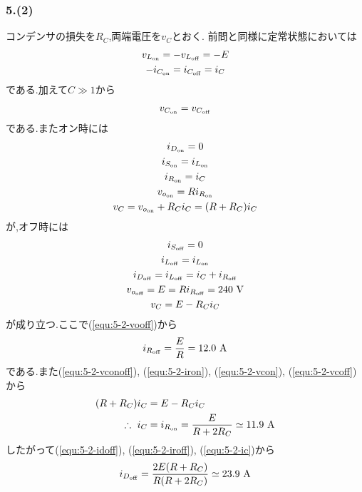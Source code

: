 \subsubsection*{5.(2)}
コンデンサの損失を$R_C$,両端電圧を$v_C$とおく.
前問と同様に定常状態においては
\begin{gather}
  v_{L_{\rm on}}=-v_{L_{\rm off}}=-E\\
  -i_{C_{\rm on}}=i_{C_{\rm off}}=i_C
\end{gather}
である.加えて$C\gg1$から
\begin{align}
  \label{equ:5-2-vconoff}
  v_{C_{\rm on}}=v_{C_{\rm off}}
\end{align}
である.またオン時には
\begin{gather}
  i_{D_{\rm on}}=0\\
  \label{equ:5-2-ison}
  i_{S_{\rm on}}=i_{L_{\rm on}}\\
  \label{equ:5-2-iron}
  i_{R_{\rm on}}=i_C\\
  \label{equ:5-2-voon}
  v_{o_{\rm on}}=Ri_{R_{\rm on}}\\
  \label{equ:5-2-vcon}
  v_C=v_{o_{\rm on}}+R_Ci_C=(R+R_C)i_C
\end{gather}
が,オフ時には
\begin{gather}
  i_{S_{\rm off}}=0\\
  \label{equ:5-2-iloff}
  i_{L_{\rm off}}=i_{L_{\rm on}}\\
  \label{equ:5-2-idoff}
  i_{D_{\rm off}}=i_{L_{\rm off}}=i_C+i_{R_{\rm off}}\\
  \label{equ:5-2-vooff}
  v_{o_{\rm off}}=E=Ri_{R_{\rm off}}=240\ \si{\volt}\\
  \label{equ:5-2-vcoff}
  v_C=E-R_Ci_C
\end{gather}
が成り立つ.ここで(\ref{equ:5-2-vooff})から
\begin{align}
  \label{equ:5-2-iroff}
  i_{R_{\rm off}}=\frac{E}{R}=12.0\ \si{\ampere}
\end{align}
である.また(\ref{equ:5-2-vconoff}), (\ref{equ:5-2-iron}), (\ref{equ:5-2-vcon}), (\ref{equ:5-2-vcoff})から
\begin{align}
  \begin{split}
    \label{equ:5-2-ic}
    (R+R_C)i_C&=E-R_Ci_C\\
    \therefore\ i_C&=i_{R_{\rm on}}=\frac{E}{R+2R_C}\simeq11.9\ \si{\ampere}
  \end{split}
\end{align}
したがって(\ref{equ:5-2-idoff}), (\ref{equ:5-2-iroff}), (\ref{equ:5-2-ic})から
\begin{align}
  i_{D_{\rm off}}=\frac{2E(R+R_C)}{R(R+2R_C)}\simeq23.9\ \si{\ampere}
\end{align}
